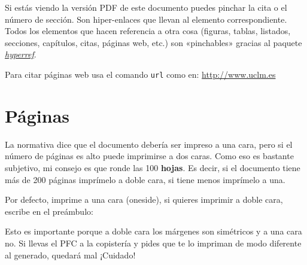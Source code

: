 Si estás viendo la versión PDF de este documento puedes pinchar la cita o el número de
sección. Son hiper-enlaces que llevan al elemento correspondiente. Todos los elementos que
hacen referencia a otra cosa (figuras, tablas, listados, secciones, capítulos, citas,
páginas web, etc.) son «pinchables» gracias al paquete
\href{http://latex.tugraz.at/_media/docs/hyperref.pdf}{\emph{hyperref}}.

Para citar páginas web usa el comando \texttt{url} como en: \url{http://www.uclm.es}

\section{Páginas}
\label{sec:paginas}

La normativa dice que el documento debería ser impreso a una cara, pero si el
número de páginas es alto puede imprimirse a dos caras. Como eso es bastante
subjetivo, mi consejo es que ronde las 100 \textbf{hojas}. Es decir, si el
documento tiene más de 200 páginas imprímelo a doble cara, si tiene menos
imprímelo a una.

Por defecto, \arcopfc{} imprime a una cara (oneside), si quieres imprimir a doble cara,
escribe en el preámbulo:


Esto es importante porque a doble cara los márgenes son simétricos y a una cara
no. Si llevas el PFC a la copistería y pides que te lo impriman de modo
diferente al generado, quedará mal ¡Cuidado!
